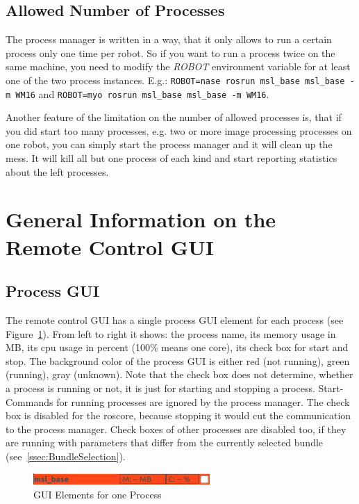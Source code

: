 \subsection*{Allowed Number of Processes}

The process manager is written in a way, that it only allows to run a certain process only one time per robot. So if you want to run a process twice on the same machine, you need to modify the \emph{ROBOT} environment variable for at least one of the two process instances. E.g.: \verb#ROBOT=nase rosrun msl_base msl_base -m WM16# and \verb#ROBOT=myo rosrun msl_base msl_base -m WM16#. 

Another feature of the limitation on the number of allowed processes is, that if you did start too many processes, e.g. two or more image processing processes on one robot, you can simply start the process manager and it will clean up the mess. It will kill all but one process of each kind and start reporting statistics about the left processes.

\section{General Information on the Remote Control GUI}
\label{sec:GenRemoteControl GUI}

\subsection*{Process GUI}

The remote control GUI has a single process GUI element for each process (see Figure~\ref{fig:ProcManProcessGUI}). From left to right it shows: the process name, its memory usage in MB, its cpu usage in percent (100\% means one core), its check box for start and stop. The background color of the process GUI is either red (not running), green (running), gray (unknown). Note that the check box does not determine, whether a process is running or not, it is just for starting and stopping a process. Start-Commands for running processes are ignored by the process manager. The check box is disabled for the roscore, because stopping it would cut the communication to the process manager. Check boxes of other processes are disabled too, if they are running with parameters that differ from the currently selected bundle (see~\ref{ssec:BundleSelection}).

\begin{figure}[htbp]
 \centering
 \includegraphics[width=0.6\textwidth]{img/ProcManProcessGUI.png}
 \caption{GUI Elements for one Process}
 \label{fig:ProcManProcessGUI}
\end{figure}

